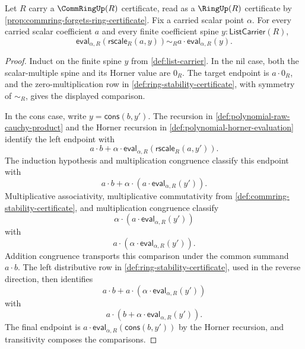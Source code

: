 \begin{lemma}
\label{lem:horner-evaluation-raw-scalar-product}
Let $R$ carry a $\CommRingUp(R)$ certificate, read as a $\RingUp(R)$ certificate by \autoref{prop:commring-forgets-ring-certificate}. Fix a carried scalar point $\alpha$. For every carried scalar coefficient $a$ and every finite coefficient spine $y:\mathsf{ListCarrier}(R)$,
$$
\mathsf{eval}_{\alpha,R}(\mathsf{rscale}_R(a,y))\sim_R
 a\cdot\mathsf{eval}_{\alpha,R}(y).
$$
\end{lemma}
\begin{proof}
Induct on the finite spine $y$ from \autoref{def:list-carrier}. In the nil case, both the scalar-multiple spine and its Horner value are $0_R$. The target endpoint is $a\cdot0_R$, and the zero-multiplication row in \autoref{def:ring-stability-certificate}, with symmetry of $\sim_R$, gives the displayed comparison.

In the cons case, write $y=\mathsf{cons}(b,y')$. The recursion in \autoref{def:polynomial-raw-cauchy-product} and the Horner recursion in \autoref{def:polynomial-horner-evaluation} identify the left endpoint with
$$
a\cdot b+\alpha\cdot\mathsf{eval}_{\alpha,R}(\mathsf{rscale}_R(a,y')).
$$
The induction hypothesis and multiplication congruence classify this endpoint with
$$
a\cdot b+\alpha\cdot(a\cdot\mathsf{eval}_{\alpha,R}(y')).
$$
Multiplicative associativity, multiplicative commutativity from \autoref{def:commring-stability-certificate}, and multiplication congruence classify
$$
\alpha\cdot(a\cdot\mathsf{eval}_{\alpha,R}(y'))
$$
with
$$
a\cdot(\alpha\cdot\mathsf{eval}_{\alpha,R}(y')).
$$
Addition congruence transports this comparison under the common summand $a\cdot b$. The left distributive row in \autoref{def:ring-stability-certificate}, used in the reverse direction, then identifies
$$
a\cdot b+a\cdot(\alpha\cdot\mathsf{eval}_{\alpha,R}(y'))
$$
with
$$
a\cdot(b+\alpha\cdot\mathsf{eval}_{\alpha,R}(y')).
$$
The final endpoint is $a\cdot\mathsf{eval}_{\alpha,R}(\mathsf{cons}(b,y'))$ by the Horner recursion, and transitivity composes the comparisons.
\end{proof}

